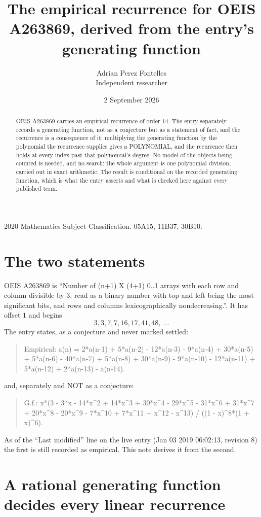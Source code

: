 \documentclass[11pt,a4paper]{article}
\title{The empirical recurrence for OEIS A263869, derived from the entry's generating function}
\author{Adrian Perez Fontelles\\ \small Independent researcher}
\date{2 September 2026}
\theoremstyle{plain}
\theoremstyle{definition}
\begin{document}
\maketitle

\begin{abstract}
OEIS A263869 carries an empirical recurrence of order $14$. The entry separately records a
generating function, not as a conjecture but as a statement of fact, and the recurrence is a
consequence of it: multiplying the generating function by the polynomial the recurrence
supplies gives a POLYNOMIAL, and the recurrence then holds at every index past that
polynomial's degree. No model of the objects being counted is needed, and no search: the
whole argument is one polynomial division, carried out in exact arithmetic. The result is
conditional on the recorded generating function, which is what the entry asserts and what is
checked here against every published term.
\end{abstract}

\noindent\small 2020 Mathematics Subject Classification. 05A15, 11B37, 30B10.\normalsize

\section{The two statements}

OEIS A263869 is ``Number of (n+1) X (4+1) 0..1 arrays with each row and column divisible by 3, read as a binary number with top and left being the most significant bits, and rows and columns lexicographically nondecreasing.''. It has offset $1$ and begins
\[
3, 3, 7, 7, 16, 17, 41, 48,\ \dots
\]
The entry states, as a conjecture and never marked settled:
\begin{quote}
Empirical: a(n) = 2*a(n-1) + 5*a(n-2) - 12*a(n-3) - 9*a(n-4) + 30*a(n-5) + 5*a(n-6) - 40*a(n-7) + 5*a(n-8) + 30*a(n-9) - 9*a(n-10) - 12*a(n-11) + 5*a(n-12) + 2*a(n-13) - a(n-14).
\end{quote}
and, separately and NOT as a conjecture:
\begin{quote}
G.f.: x*(3 - 3*x - 14*x\^{}2 + 14*x\^{}3 + 30*x\^{}4 - 29*x\^{}5 - 31*x\^{}6 + 31*x\^{}7 + 20*x\^{}8 - 20*x\^{}9 - 7*x\^{}10 + 7*x\^{}11 + x\^{}12 - x\^{}13) / ((1 - x)\^{}8*(1 + x)\^{}6).
\end{quote}
As of the ``Last modified'' line on the live entry (Jan 03 2019 06:02:13, revision 8) the first is still
recorded as empirical. This note derives it from the second.

\section{A rational generating function decides every linear recurrence}
\end{document}
